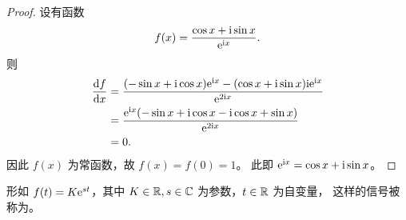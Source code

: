 \begin{proof}
     设有函数
    \begin{align*}
        f(x) = \frac{\cos x + \mathrm{i} \sin x}{\mathrm{e}^{\mathrm{i} x}}.
    \end{align*}
    则
    \begin{align*}
        \frac{\mathrm{d}f}{\mathrm{d}x} & = \frac{(-\sin x + \mathrm{i} \cos x)\mathrm{e}^{\mathrm{i} x}
                    - (\cos x + \mathrm{i} \sin x)\mathrm{i} \mathrm{e}^{\mathrm{i} x}}
                    {\mathrm{e}^{2\mathrm{i} x}} \\
        & = \frac{\mathrm{e}^{\mathrm{i} x}(-\sin x + \mathrm{i} \cos x - \mathrm{i} \cos x + \sin x)}{\mathrm{e}^{2\mathrm{i} x}} \\
        & = 0.
    \end{align*}
    因此 $f(x)$ 为常函数，故 $f(x) = f(0) = 1$。
    此即 $\mathrm{e}^{\mathrm{i} x} = \cos x + \mathrm{i} \sin x$。
\end{proof}

\begin{definition}[复指数信号]
    形如 $f(t) = K\mathrm{e}^{st}$，其中 $K \in \mathbb{R}, s \in \mathbb{C}$ 为参数，$t \in \mathbb{R}$ 为自变量，
    这样的信号被称为。
\end{definition}

